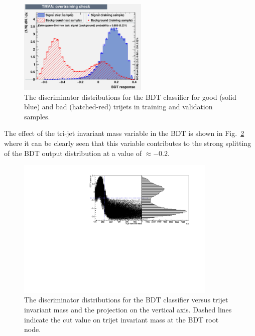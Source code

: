 \begin{figure}[ht!]
\begin{center}
    \includegraphics[width=0.55\textwidth]{images/Run2/overtrain_BDT.pdf}
    \caption{The discriminator distributions for the BDT classifier for good (solid blue) and bad (hatched-red) trijets in training and validation samples.}
    \label{fig:TrijetBDTOutput13}
\end{center}
\end{figure}

The effect of the tri-jet invariant mass variable in the BDT is shown in Fig.~\ref{fig:multimode13} where it can be clearly seen that this variable contributes to the strong splitting of the BDT output distribution at a value of $\approx-0.2$.

\begin{figure}[ht!]
\begin{center}
    \includegraphics[width=0.85\textwidth]{images/Run2/multimode.pdf}
    \caption{The discriminator distributions for the BDT classifier versus trijet invariant mass and the projection on the vertical axis. Dashed lines indicate the cut value on trijet invariant mass at the BDT root node.}
    \label{fig:multimode13}
\end{center}
\end{figure}

